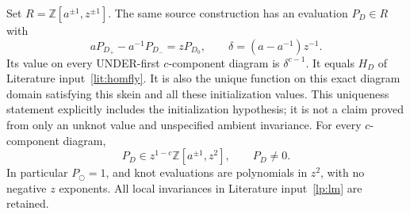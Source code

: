 \begin{theorem}\label{lp:core}\leanok
Set $R=\mathbb Z[a^{\pm1},z^{\pm1}]$. The same source construction has
an evaluation $P_D\in R$ with
\begin{equation}\label{lp:skein}
 aP_{D_+}-a^{-1}P_{D_-}=zP_{D_0},
 \qquad \delta=(a-a^{-1})z^{-1}.
\end{equation}
Its value on every UNDER-first $c$-component diagram is $\delta^{c-1}$.
It equals $H_D$ of Literature input~\ref{lit:homfly}. It is also the unique
function on this exact diagram domain satisfying this
skein and all these initialization values. This uniqueness statement
explicitly includes the initialization hypothesis; it is not a claim
proved from only an unknot value and unspecified ambient invariance.
For every $c$-component diagram,
\begin{equation}\label{lp:support}
 P_D\in z^{1-c}\mathbb Z[a^{\pm1},z^2],\qquad P_D\ne0.
\end{equation}
In particular $P_{\bigcirc}=1$, and knot evaluations are polynomials in
$z^2$, with no negative $z$ exponents. All local invariances in
Literature input~\ref{lp:lm} are retained.

\end{theorem}
